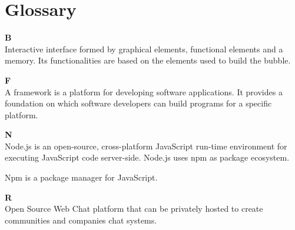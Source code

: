 \section{Glossary}\label{Glossary}

\textbf{\huge{B}}\\
Interactive interface formed by graphical elements, functional elements and a memory. Its functionalities are based on the elements used to build the bubble.

\textbf{\huge{F}}\\
A framework is a platform for developing software applications. It provides a foundation on which software developers can build programs for a specific platform.

\textbf{\huge{N}}\\
Node.js is an open-source, cross-platform JavaScript run-time environment for executing JavaScript code server-side.
Node.js uses npm as package ecosystem. 

Npm is a package manager for JavaScript. 

\textbf{\huge{R}}\\
Open Source Web Chat platform that can be privately hosted to create communities and companies chat systems.



